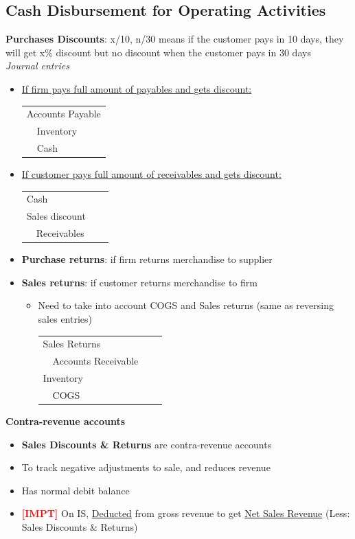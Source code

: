 \documentclass{article}
\newcommand{\impt}[0]{\textcolor{red}{\textbf{[IMPT] }}}
\begin{document}
\begin{multicols}{2}
\subsection{Cash Disbursement for Operating Activities}
\textbf{Purchases Discounts}: x/10, n/30 means if the customer pays in 10 days, they will get x\% discount but no discount when the customer pays in 30 days\\
\textit{Journal entries}
\begin{itemize}
	\item \underline{If firm pays full amount of payables and gets discount:}\vspace{0.5em}\\
	\begin{tabular}{llll}
	\multicolumn{4}{l}{Accounts Payable}\\
	& Inventory& &\\
	& Cash& &
	\end{tabular}\vspace{0.5em}
    \item \underline{If customer pays full amount of receivables and gets discount:}\vspace{0.5em}\\
    \begin{tabular}{llll}
    	\multicolumn{4}{l}{Cash}\\
    	\multicolumn{4}{l}{Sales discount}\\
    	& Receivables& &
    \end{tabular}\vspace{0.5em}
    \item \textbf{Purchase returns}: if firm returns merchandise to supplier
    \item \textbf{Sales returns}: if customer returns merchandise to firm
    \begin{itemize}
    	\item Need to take into account COGS and Sales returns (same as reversing sales entries)\vspace{0.5em}\\
    	\begin{tabular}{llll}
    		\multicolumn{4}{l}{Sales Returns}\\
    		& Accounts Receivable& &\\
    		\multicolumn{4}{l}{Inventory}\\
    		& COGS& &
    	\end{tabular}\vspace{1em}
    \end{itemize}
\end{itemize}
\textbf{Contra-revenue accounts}
\begin{itemize}
	\item \textbf{Sales Discounts \& Returns} are contra-revenue accounts
	\item To track negative adjustments to sale, and reduces revenue
	\item Has normal debit balance
	\item \impt On IS, \underline{Deducted} from gross revenue to get \underline{Net Sales Revenue} (Less: Sales Discounts \& Returns)
\end{itemize}

\end{multicols}
\end{document}
